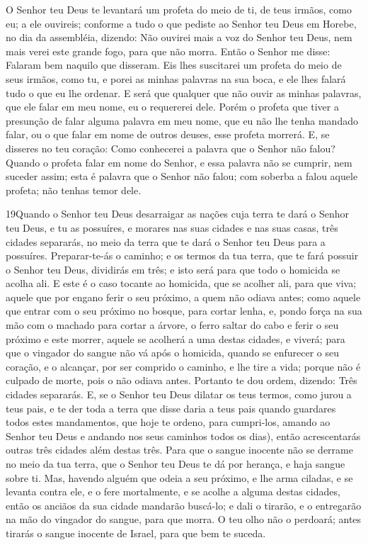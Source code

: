 O Senhor teu Deus te levantará um profeta do meio de ti, de teus
irmãos, como eu; a ele ouvireis; conforme a tudo o que
pediste ao Senhor teu Deus em Horebe, no dia da assembléia, dizendo:
Não ouvirei mais a voz do Senhor teu Deus, nem mais verei este
grande fogo, para que não morra. Então o Senhor me disse:
Falaram bem naquilo que disseram. Eis lhes suscitarei um
profeta do meio de seus irmãos, como tu, e porei as minhas palavras
na sua boca, e ele lhes falará tudo o que eu lhe ordenar. E
será que qualquer que não ouvir as minhas palavras, que ele falar em
meu nome, eu o requererei dele. Porém o profeta que tiver a
presunção de falar alguma palavra em meu nome, que eu não lhe tenha
mandado falar, ou o que falar em nome de outros deuses, esse profeta
morrerá. E, se disseres no teu coração: Como conhecerei a
palavra que o Senhor não falou? Quando o profeta falar em
nome do Senhor, e essa palavra não se cumprir, nem suceder assim;
esta é palavra que o Senhor não falou; com soberba a falou aquele
profeta; não tenhas temor dele.

\medskip

\lettrine{19} Quando o Senhor teu Deus desarraigar as nações
cuja terra te dará o Senhor teu Deus, e tu as possuíres, e morares
nas suas cidades e nas suas casas, três cidades separarás, no
meio da terra que te dará o Senhor teu Deus para a possuíres.
Preparar-te-ás o caminho; e os termos da tua terra, que te fará
possuir o Senhor teu Deus, dividirás em três; e isto será para que
todo o homicida se acolha ali. E este é o caso tocante ao
homicida, que se acolher ali, para que viva; aquele que por engano
ferir o seu próximo, a quem não odiava antes; como aquele que
entrar com o seu próximo no bosque, para cortar lenha, e, pondo
força na sua mão com o machado para cortar a árvore, o ferro saltar
do cabo e ferir o seu próximo e este morrer, aquele se acolherá a
uma destas cidades, e viverá; para que o vingador do sangue não
vá após o homicida, quando se enfurecer o seu coração, e o alcançar,
por ser comprido o caminho, e lhe tire a vida; porque não é culpado
de morte, pois o não odiava antes. Portanto te dou ordem,
dizendo: Três cidades separarás. E, se o Senhor teu Deus dilatar
os teus termos, como jurou a teus pais, e te der toda a terra que
disse daria a teus pais quando guardares todos estes
mandamentos, que hoje te ordeno, para cumpri-los, amando ao Senhor
teu Deus e andando nos seus caminhos todos os dias), então
acrescentarás outras três cidades além destas três. Para que
o sangue inocente não se derrame no meio da tua terra, que o Senhor
teu Deus te dá por herança, e haja sangue sobre ti. Mas,
havendo alguém que odeia a seu próximo, e lhe arma ciladas, e se
levanta contra ele, e o fere mortalmente, e se acolhe a alguma
destas cidades, então os anciãos da sua cidade mandarão
buscá-lo; e dali o tirarão, e o entregarão na mão do vingador do
sangue, para que morra. O teu olho não o perdoará; antes
tirarás o sangue inocente de Israel, para que bem te suceda.

